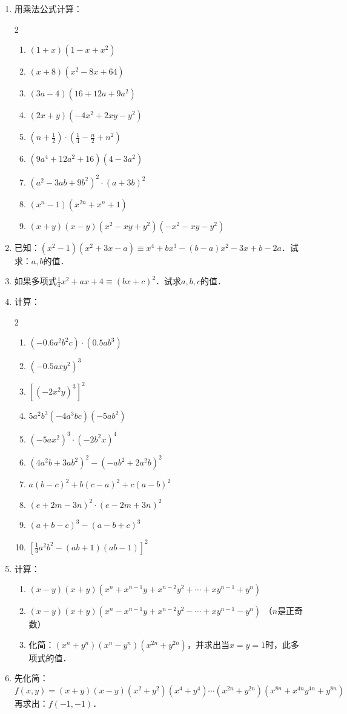 \begin{enumerate}
\item 用乘法公式计算：
  \begin{multicols}{2}
    \begin{enumerate}
        \item $(1+x)(1-x+x^2)$
        \item $(x+8)(x^2-8x+64)$
        \item $(3a-4)(16+12a+9a^2)$
        \item $(2x+y)(-4x^2+2xy-y^2)$
        \item $\left(n+\frac{1}{2}\right)\cdot \left(\frac{1}{4}-\frac{n}{2}+n^2\right)$
        \item $(9a^4+12a^2+16)(4-3a^2)$
        \item $(a^2-3ab+9b^2)^2\cdot (a+3b)^2$
        \item $(x^n-1)(x^{2n}+x^n+1)$
        \item $(x+y)(x-y)(x^2-xy+y^2)(-x^2-xy-y^2)$
    \end{enumerate}
  \end{multicols}

\item 已知：$(x^2-1)(x^2+3x-a)\equiv x^4+bx^3-(b-a)x^2-3x+b-2a$．试求：$a,b$的值．
\item  如果多项式$\frac{1}{4}x^2+ax+4\equiv (bx+c)^2$．试求$a,b,c$的值．
\item 计算：
  \begin{multicols}{2}
    \begin{enumerate}
        \item $(-0.6a^2b^2c)\cdot (0.5ab^3)$
        \item $(-0.5axy^2)^3$
        \item $\left[(-2x^2y)^3\right]^2$
        \item $5a^2b^3 (-4a^3bc)(-5ab^2)$
        \item $(-5ax^2)^3\cdot (-2b^2x)^4$
        \item $(4a^2b+3ab^2)^2-(-ab^2+2a^2b)^2$
        \item $a(b-c)^2+b(c-a)^2+c(a-b)^2$
        \item $(e+2m-3n)^2\cdot (e-2m+3n)^2$
        \item $(a+b-c)^3-(a-b+c)^3$
        \item $\left[\frac{1}{3}a^2b^2-(ab+1)(ab-1)\right]^2$
    \end{enumerate}
  \end{multicols}

\item 计算：
\begin{enumerate}
    \item $(x-y)(x+y)(x^n+x^{n-1}y+x^{n-2}y^2+\cdots +xy^{n-1}+y^n)$
    \item $(x-y)(x+y)(x^n-x^{n-1}y+x^{n-2}y^2-\cdots +xy^{n-1}-y^n)$ （$n$是正奇数）
    \item 化简：$(x^n+y^n)(x^n-y^n)(x^{2n}+y^{2n})$，并求出当$x=y=1$时，此多项式的值．
\end{enumerate}

\item 先化简：$f(x,y)=(x+y)(x-y)(x^2+y^2)(x^4+y^4)\cdots (x^{2n}+y^{2n})\left(x^{8n}+x^{4n}y^{4n}+y^{8n}\right)$
再求出：$f(-1,-1)$．
\end{enumerate}

